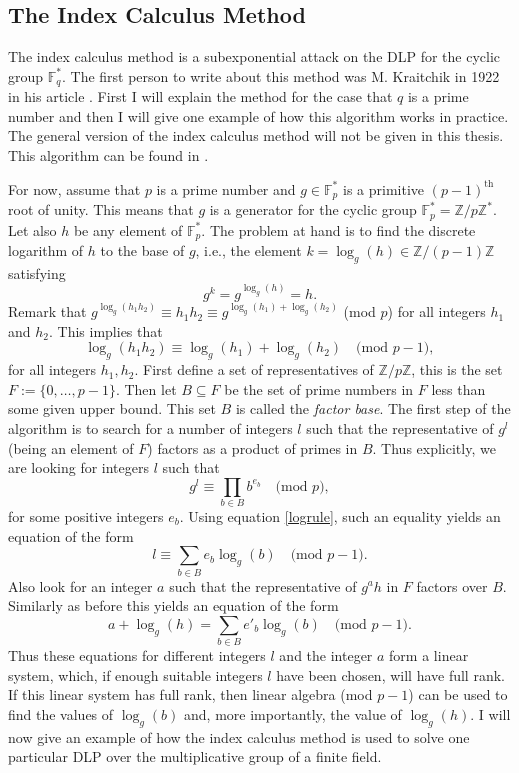 \documentclass{article}
\numberwithin{equation}{section}
\theoremstyle{definition}
\newcommand{\ZZ}{{\mathbb Z}} %
\newcommand{\Zmod}[1]{\ZZ / #1\ZZ} %
\newcommand{\FF}[1]{{\mathbb F}_{#1}} %
\begin{document}
\subsection{The Index Calculus Method}\label{ICMethod}
The index calculus method is a subexponential attack on the DLP for the cyclic group $\FF{q}^*$. The first person to write about this method was M. Kraitchik in 1922 in his article \cite{Kraitchik}.  First I will explain the method for the case that $q$ is a prime number and then I will give one example of how this algorithm works in practice. The general version of the index calculus method will not be given in this thesis. This algorithm can be found in \cite[IV.3]{Koblitz1}.\par 
For now, assume that $p$ is a prime number and $g\in\FF{p}^*$ is a primitive $(p-1)^\text{th}$ root of unity. This means that $g$ is a generator for the cyclic group $\FF{p}^*=\Zmod{p}^*$. Let also $h$ be any element of $\FF{p}^*$. The problem at hand is to find the discrete logarithm of $h$ to the base of $g$, i.e., the element $k=\log_g(h) \in \Zmod{(p-1)}$ satisfying 
$$g^k=g^{\log_g (h)}=h.$$ 
Remark that $g^{\log_g(h_1h_2)}\equiv h_1h_2\equiv g^{\log_g(h_1)+\log_g(h_2)}$ (mod $p$) for all integers $h_1$ and $h_2$. This implies that 
\begin{equation}\label{logrule} \log_g(h_1h_2) \equiv \log_g(h_1) + \log_g(h_2) \quad \text{(mod $p-1$)}, \end{equation} 
for all integers $h_1,h_2$. First define a set of representatives of $\Zmod{p}$, this is the set $F:=\{0,\ldots,p-1\}$. Then let $B\subseteq F$ be the set of prime numbers in $F$ less than some given upper bound. This set $B$ is called the \emph{factor base}. The first step of the algorithm is to search for a number of integers $l$ such that the representative of $g^l$ (being an element of $F$) factors as a product of primes in $B$. Thus explicitly, we are looking for integers $l$ such that
$$g^l\equiv\prod_{b\in B} b^{e_b} \quad \text{(mod $p$)},$$ 
for some positive integers $e_b$. Using equation \ref{logrule}, such an equality yields an equation of the form
$$l\equiv\sum_{b \in B} e_b  \log_g(b) \quad \text{(mod $p-1$)}.$$ 
Also look for an integer $a$ such that the representative of $g^ah$ in $F$ factors over $B$. Similarly as before this yields an equation of the form 
$$a+\log_g(h)=\sum_{b\in B} e'_b  \log_g(b) \quad \text{(mod $p-1$)}.$$ 
Thus these equations for different integers $l$ and the integer $a$ form a linear system, which, if enough suitable integers $l$ have been chosen, will have full rank. If this linear system has full rank, then linear algebra (mod $p-1$) can be used to find the values of $\log_g(b)$ and, more importantly, the value of $\log_g(h)$. I will now give an example of how the index calculus method is used to solve one particular DLP over the multiplicative group of a finite field.
\end{document}
